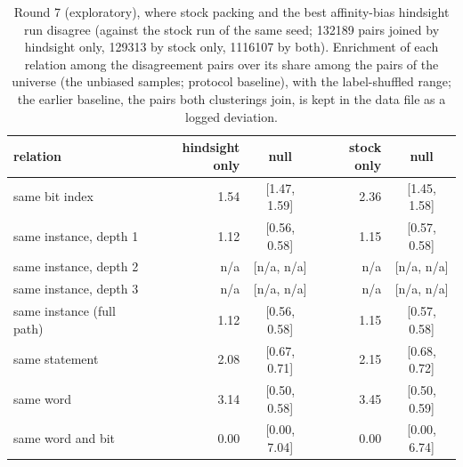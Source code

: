 \begin{table}[t]
\caption{Round 7 (exploratory), where stock packing and the best affinity-bias hindsight run disagree (against the stock run of the same seed; 132189 pairs joined by hindsight only, 129313 by stock only, 1116107 by both). Enrichment of each relation among the disagreement pairs over its share among the pairs of the universe (the unbiased samples; protocol baseline), with the label-shuffled range; the earlier baseline, the pairs both clusterings join, is kept in the data file as a logged deviation.}
\label{tab:r7disagree}
\centering\scriptsize
\begin{tabular}{@{}lrcrc@{}}
\toprule
relation & hindsight only & null & stock only & null \\
\midrule
same bit index & 1.54 & [1.47, 1.59] & 2.36 & [1.45, 1.58] \\
same instance, depth 1 & 1.12 & [0.56, 0.58] & 1.15 & [0.57, 0.58] \\
same instance, depth 2 & n/a & [n/a, n/a] & n/a & [n/a, n/a] \\
same instance, depth 3 & n/a & [n/a, n/a] & n/a & [n/a, n/a] \\
same instance (full path) & 1.12 & [0.56, 0.58] & 1.15 & [0.57, 0.58] \\
same statement & 2.08 & [0.67, 0.71] & 2.15 & [0.68, 0.72] \\
same word & 3.14 & [0.50, 0.58] & 3.45 & [0.50, 0.59] \\
same word and bit & 0.00 & [0.00, 7.04] & 0.00 & [0.00, 6.74] \\
\bottomrule
\end{tabular}
\end{table}

